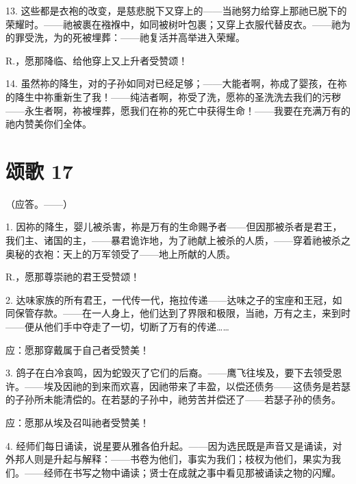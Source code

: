 13. 这些都是衣袍的改变，是慈悲脱下又穿上的——当祂努力给穿上那祂已脱下的荣耀时。——祂被裹在襁褓中，如同被树叶包裹；又穿上衣服代替皮衣。——祂为的罪受洗，为的死被埋葬：——祂复活并高举进入荣耀。\par

R.，愿那降临、给他穿上又上升者受赞颂！\par

14. 虽然祢的降生，对的子孙如同对已经足够；——大能者啊，祢成了婴孩，在祢的降生中祢重新生了我！——纯洁者啊，祢受了洗，愿祢的圣洗洗去我们的污秽——永生者啊，祢被埋葬，愿我们在祢的死亡中获得生命！——我要在充满万有的祂内赞美你们全体。\par

\par


\section{颂歌 17}

（应答。——）\par

1. 因祢的降生，婴儿被杀害，祢是万有的生命赐予者——但因那被杀者是君王，我们主、诸国的主，——暴君诡诈地，为了祂献上被杀的人质，——穿着祂被杀之奥秘的衣袍：天上的万军领受了——地上所献的人质。\par

R.，愿那尊崇祂的君王受赞颂！\par

2. 达味家族的所有君王，一代传一代，拖拉传递——达味之子的宝座和王冠，如同保管存款。——在一人身上，他们达到了界限和极限，当祂，万有之主，来到时——便从他们手中夺走了一切，切断了万有的传递……\par

应：愿那穿戴属于自己者受赞美！\par

3. 鸽子在白冷哀鸣，因为蛇毁灭了它们的后裔。——鹰飞往埃及，要下去领受恩许。——埃及因祂的到来而欢喜，因祂带来了丰盈，以偿还债务——这债务是若瑟的子孙所未能清偿的。在若瑟的子孙中，祂劳苦并偿还了——若瑟子孙的债务。\par

应：愿那从埃及召叫祂者受赞美！\par

4. 经师们每日诵读，说星要从雅各伯升起。——因为选民既是声音又是诵读，对外邦人则是升起与解释：——书卷为他们，事实为我们；枝杈为他们，果实为我们。——经师在书写之物中诵读；贤士在成就之事中看见那被诵读之物的闪耀。\par


